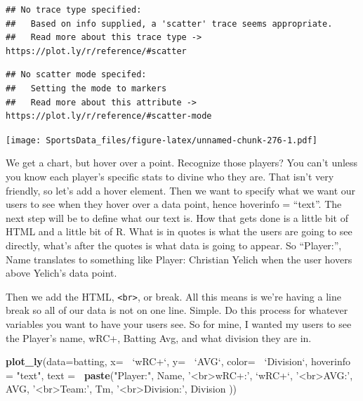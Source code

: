 \documentclass[]{book}
\newenvironment{Shaded}{\begin{snugshade}}{\end{snugshade}}
\newcommand{\DataTypeTok}[1]{\textcolor[rgb]{0.13,0.29,0.53}{#1}}
\newcommand{\KeywordTok}[1]{\textcolor[rgb]{0.13,0.29,0.53}{\textbf{#1}}}
\newcommand{\NormalTok}[1]{#1}
\newcommand{\OperatorTok}[1]{\textcolor[rgb]{0.81,0.36,0.00}{\textbf{#1}}}
\newcommand{\StringTok}[1]{\textcolor[rgb]{0.31,0.60,0.02}{#1}}
\begin{document}
\begin{verbatim}
## No trace type specified:
##   Based on info supplied, a 'scatter' trace seems appropriate.
##   Read more about this trace type -> https://plot.ly/r/reference/#scatter
\end{verbatim}

\begin{verbatim}
## No scatter mode specifed:
##   Setting the mode to markers
##   Read more about this attribute -> https://plot.ly/r/reference/#scatter-mode
\end{verbatim}

\texttt{[image: SportsData\_files/figure-latex/unnamed-chunk-276-1.pdf]}

We get a chart, but hover over a point. Recognize those players? You can't unless you know each player's specific stats to divine who they are. That isn't very friendly, so let's add a hover element. Then we want to specify what we want our users to see when they hover over a data point, hence hoverinfo = ``text''. The next step will be to define what our text is. How that gets done is a little bit of HTML and a little bit of R. What is in quotes is what the users are going to see directly, what's after the quotes is what data is going to appear. So ``Player:'', Name translates to something like Player: Christian Yelich when the user hovers above Yelich's data point.

Then we add the HTML, \texttt{\textless{}br\textgreater{}}, or break. All this means is we're having a line break so all of our data is not on one line. Simple. Do this process for whatever variables you want to have your users see. So for mine, I wanted my users to see the Player's name, wRC+, Batting Avg, and what division they are in.

\begin{Shaded}
\begin{Highlighting}[]
\KeywordTok{plot_ly}\NormalTok{(}\DataTypeTok{data=}\NormalTok{batting, }\DataTypeTok{x=} \OperatorTok{~}\StringTok{`}\DataTypeTok{wRC+}\StringTok{`}\NormalTok{, }\DataTypeTok{y=} \OperatorTok{~}\StringTok{`}\DataTypeTok{AVG}\StringTok{`}\NormalTok{, }\DataTypeTok{color=} \OperatorTok{~}\StringTok{`}\DataTypeTok{Division}\StringTok{`}\NormalTok{,}
        \DataTypeTok{hoverinfo =} \StringTok{"text"}\NormalTok{,}
        \DataTypeTok{text =} \OperatorTok{~}\KeywordTok{paste}\NormalTok{(}\StringTok{"Player:"}\NormalTok{, Name,}
                      \StringTok{'<br>wRC+:'}\NormalTok{, }\StringTok{`}\DataTypeTok{wRC+}\StringTok{`}\NormalTok{,}
                      \StringTok{'<br>AVG:'}\NormalTok{, AVG,}
                      \StringTok{'<br>Team:'}\NormalTok{, Tm,}
                      \StringTok{'<br>Division:'}\NormalTok{, Division}
\NormalTok{                      ))}
\end{Highlighting}
\end{Shaded}
\end{document}

